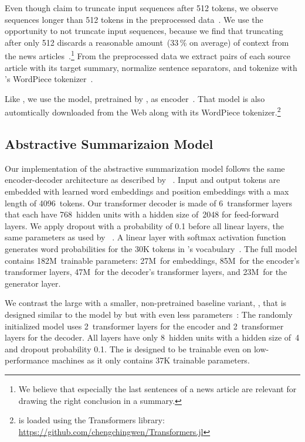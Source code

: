 Even though \citeauthor{LiuL2019} claim to truncate input sequences after 512 tokens, we observe sequences longer than 512 tokens in the preprocessed data~\cite{LiuL2019}.
We use the opportunity to not truncate input sequences, because we find that truncating after only 512 discards a reasonable amount~(33\,\% on average) of context from the news articles~\cite{NallapatiZSGX2016}.\footnote{We believe that especially the last sentences of a news article are relevant for drawing the right conclusion in a summary.}
From the preprocessed data we extract pairs of each source article with its target summary, normalize sentence separators, and tokenize with \Bert's WordPiece tokenizer~\cite{DevlinCLT2019}.

Like \citeauthor{LiuL2019}, we use the \BertBase model, pretrained by \citeauthor{DevlinCLT2019}, as encoder~\cite{DevlinCLT2019}.
That \Bert model is also automtically downloaded from the Web along with its WordPiece tokenizer.\footnote{\BertBase is loaded using the Transformers library: \url{https://github.com/chengchingwen/Transformers.jl}}

\subsection{Abstractive Summarizaion Model}

Our implementation of the \BertSumAbs abstractive summarization model follows the same encoder-decoder architecture as described by \citeauthor{LiuL2019}~\cite{LiuL2019}.
Input and output tokens are embedded with learned word embeddings and position embeddings with a max length of 4096~tokens.
Our transformer decoder is made of 6~transformer layers that each have 768~hidden units with a hidden size of~2048 for feed-forward layers.
We apply dropout with a probability of 0.1 before all linear layers, the same parameters as used by \citeauthor{LiuL2019}~\cite{LiuL2019}.
A linear layer with softmax activation function generates word probabilities for the 30K tokens in \Bert's vocabulary~\cite{DevlinCLT2019}.
The full \BertSumAbs model contains 182M~trainable parameters: 27M~for embeddings, 85M~for the encoder's transformer layers, 47M~for the decoder's transformer layers, and 23M~for the generator layer.

We contrast the large \BertSumAbs with a smaller, non-pretrained baseline variant, \TransformerAbsTiny, that is designed similar to the \TransformerAbs model by \citeauthor{LiuL2019} but with even less parameters~\cite{LiuL2019}: The randomly initialized model uses 2~transformer layers for the encoder and 2~transformer layers for the decoder. All layers have only 8~hidden units with a hidden size of~4 and dropout probability 0.1.
The \TransformerAbsTiny is designed to be trainable even on low-performance machines as it only contains 37K trainable parameters.

